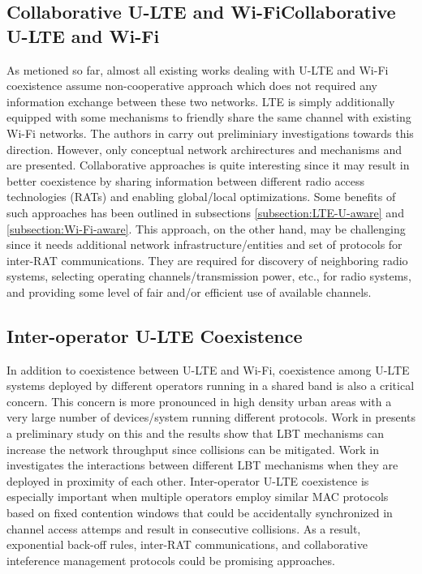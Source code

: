 \documentclass[12pt,onecolumn]{article}
\begin{document}
\subsection{Collaborative U-LTE and Wi-FiCollaborative U-LTE and Wi-Fi}

As metioned so far, almost all existing works dealing with U-LTE and Wi-Fi coexistence assume non-cooperative approach which does not required any information exchange between these two networks. LTE is simply additionally equipped with some mechanisms to friendly share the same channel with existing Wi-Fi networks. The authors in \cite{U-LTE-5G-2015, Coordinated-LTE-U-Wi-Fi-2015} carry out preliminiary investigations towards this direction. However, only conceptual network archirectures and mechanisms and are presented. Collaborative approaches is quite interesting since it may result in better coexistence by sharing information between different radio access technologies (RATs) and enabling global/local optimizations. Some benefits of such approaches has been outlined in subsections \ref{subsection:LTE-U-aware} and \ref{subsection:Wi-Fi-aware}. This approach, on the other hand, may be challenging since it needs additional network infrastructure/entities and set of protocols for inter-RAT communications. They are required for discovery of neighboring radio systems, selecting operating channels/transmission power, etc., for radio systems, and providing some level of fair and/or efficient use of available channels. 


\subsection{Inter-operator U-LTE Coexistence}

In addition to coexistence between U-LTE and Wi-Fi, coexistence among U-LTE systems deployed by different operators running in a shared band is also a critical concern. This concern is more pronounced in high density urban areas with a very large number of devices/system running different protocols. Work in \cite{LTE-U-ICC-WS-2015} presents a preliminary study on this and the results show that LBT mechanisms can increase the network throughput since collisions can be mitigated. Work in \cite{Enhanced-LTE-U-thesis-2015} investigates the interactions between different LBT mechanisms when they are deployed in proximity of each other. Inter-operator U-LTE coexistence is especially important when multiple operators employ similar MAC protocols based on fixed contention windows that could be accidentally synchronized in channel access attemps and result in consecutive collisions. As a result, exponential back-off rules, inter-RAT communications, and collaborative inteference management protocols could be promising approaches.
\end{document}
